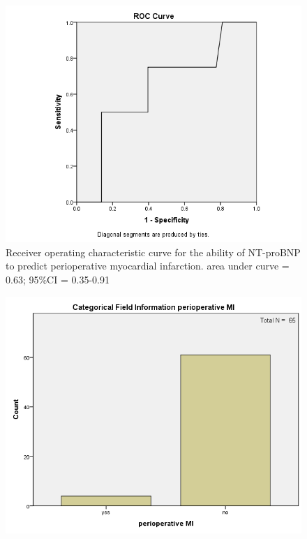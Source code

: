 \documentclass[14pt,a4paper,onecolumn]{extarticle}
\begin{document}
\clearpage
\begin{figure}
    \centering
    \includegraphics[scale=0.7]{./images/roc_mi.png}
    \caption{Receiver operating characteristic curve for the ability of NT-proBNP to predict perioperative myocardial infarction.  area under curve = 0.63; 95\%CI = 0.35-0.91}
    \label{}
\end{figure}

\clearpage
\begin{figure}
    \centering
    \includegraphics[scale=0.7]{./images/cat_mi.png}
    \caption{}
    \label{}
\end{figure}
\end{document}
